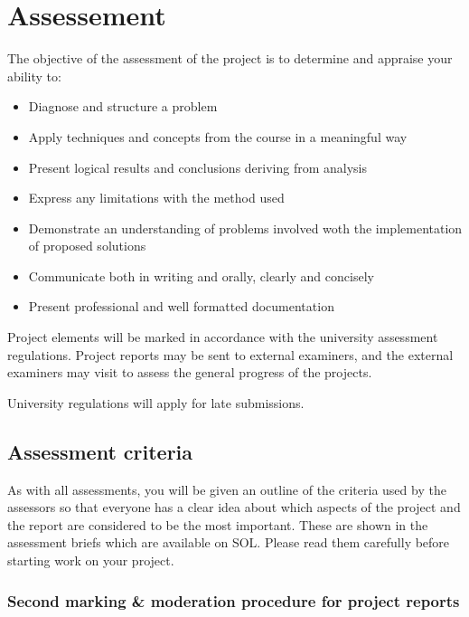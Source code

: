 \chapter{Assessement}

The objective of the assessment of the project is to determine and appraise your ability to:

\begin{itemize}
    \item Diagnose and structure a problem
    \item Apply techniques and concepts from the course in a meaningful way
    \item Present logical results and conclusions deriving from analysis
    \item Express any limitations with the method used
    \item Demonstrate an understanding of problems involved woth the implementation of proposed solutions
    \item Communicate both in writing and orally, clearly and concisely
    \item Present professional and well formatted documentation
\end{itemize}

Project elements will be marked in accordance with the university assessment regulations. Project reports may be sent to external examiners, and the external examiners may visit to assess the general progress of the projects. 

\begin{tcolorbox}
    University regulations will apply for late submissions.
\end{tcolorbox}

\section{Assessment criteria}


As with all assessments, you will be given an outline of the criteria used by the assessors so that everyone has a clear idea about which aspects of the project and the report are considered to be the most important. These are shown in the assessment briefs which are available on SOL. Please read them carefully before starting work on your project.


\subsection{Second marking \& moderation procedure for project reports}

